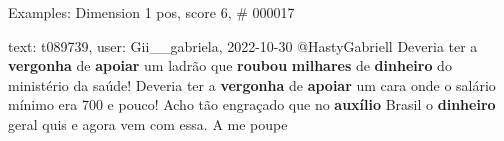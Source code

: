 \begin{frame}{Examples: Dimension 1 pos, score 6, \# 000017}
\footnotesize
\begin{exampleblock}{text: t089739, user: Gii\_\_gabriela, 2022-10-30}
@HastyGabriell Deveria ter a \textbf{vergonha} de \textbf{apoiar} um ladrão que 
\textbf{roubou} \textbf{milhares} de \textbf{dinheiro} do ministério da saúde! 
Deveria ter a \textbf{vergonha} de \textbf{apoiar} um cara onde o salário 
mínimo era 700 e pouco! Acho tão engraçado que no \textbf{auxílio} Brasil o 
\textbf{dinheiro} geral quis e agora vem com essa. A me poupe 
\end{exampleblock}
\end{frame}
